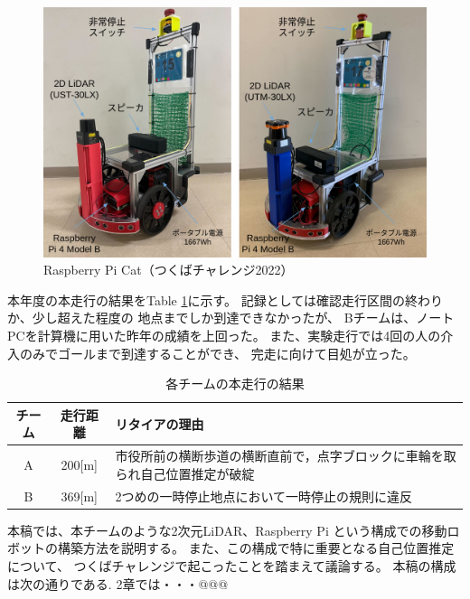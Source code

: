 \documentclass[twocolumn,9pt]{jsproceedings}
\begin{document}
\begin{figure}[h]
 	\begin{center}
 		\includegraphics[width=1.0\linewidth]{figs/raspicat.pdf}
 		\caption{Raspberry Pi Cat（つくばチャレンジ2022）}
 		\label{fig:raspicat}
 	\end{center}
\end{figure}

本年度の本走行の結果をTable \ref{MainRun}に示す。
記録としては確認走行区間の終わりか、少し超えた程度の
地点までしか到達できなかったが、
Bチームは、ノートPCを計算機に用いた昨年の成績を上回った。
また、実験走行では4回の人の介入のみでゴールまで到達することができ、
完走に向けて目処が立った。

\begin{table}[h]
  \caption{各チームの本走行の結果}
  \label{MainRun}
	\begin{tabular}{|c|c|p{5.4cm}|}
    \hline
	チーム & 走行距離 & リタイアの理由 \\
    \hline
	A & 200[m] & 市役所前の横断歩道の横断直前で，点字ブロックに車輪を取られ自己位置推定が破綻\\
    \hline
	B & 369[m] & 2つめの一時停止地点において一時停止の規則に違反 \\ 
    \hline
  \end{tabular}
\end{table}


本稿では、本チームのような2次元LiDAR、Raspberry Pi
という構成での移動ロボットの構築方法を説明する。
また、この構成で特に重要となる自己位置推定について、
つくばチャレンジで起こったことを踏まえて議論する。
本稿の構成は次の通りである. 
2章では・・・@@@
\end{document}
